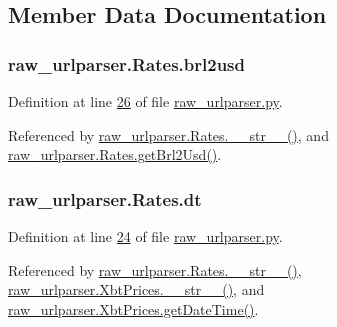 \subsection{Member Data Documentation}
\subsubsection[{\texorpdfstring{brl2usd}{brl2usd}}]{\setlength{\rightskip}{0pt plus 5cm}raw\+\_\+urlparser.\+Rates.\+brl2usd}\hypertarget{classraw__urlparser_1_1_rates_adc9df007bec75344f9f89cb631d1aeb3}{}\label{classraw__urlparser_1_1_rates_adc9df007bec75344f9f89cb631d1aeb3}


Definition at line \hyperlink{raw__urlparser_8py_source_l00026}{26} of file \hyperlink{raw__urlparser_8py_source}{raw\+\_\+urlparser.\+py}.



Referenced by \hyperlink{raw__urlparser_8py_source_l00038}{raw\+\_\+urlparser.\+Rates.\+\_\+\+\_\+str\+\_\+\+\_\+()}, and \hyperlink{raw__urlparser_8py_source_l00029}{raw\+\_\+urlparser.\+Rates.\+get\+Brl2\+Usd()}.

\subsubsection[{\texorpdfstring{dt}{dt}}]{\setlength{\rightskip}{0pt plus 5cm}raw\+\_\+urlparser.\+Rates.\+dt}\hypertarget{classraw__urlparser_1_1_rates_a09b3c7cb595f3135c3eda648b1bb4c3f}{}\label{classraw__urlparser_1_1_rates_a09b3c7cb595f3135c3eda648b1bb4c3f}


Definition at line \hyperlink{raw__urlparser_8py_source_l00024}{24} of file \hyperlink{raw__urlparser_8py_source}{raw\+\_\+urlparser.\+py}.



Referenced by \hyperlink{raw__urlparser_8py_source_l00038}{raw\+\_\+urlparser.\+Rates.\+\_\+\+\_\+str\+\_\+\+\_\+()}, \hyperlink{raw__urlparser_8py_source_l00074}{raw\+\_\+urlparser.\+Xbt\+Prices.\+\_\+\+\_\+str\+\_\+\+\_\+()}, and \hyperlink{raw__urlparser_8py_source_l00059}{raw\+\_\+urlparser.\+Xbt\+Prices.\+get\+Date\+Time()}.

